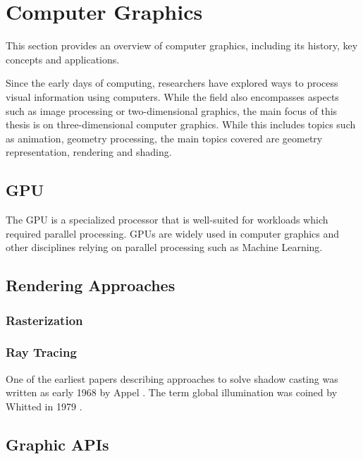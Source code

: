 
\section{Computer Graphics}

This section provides an overview of computer graphics, including its history, key concepts and applications.

Since the early days of computing, researchers have explored ways to process visual information using computers. While the field also encompasses aspects such as image processing or two-dimensional graphics, the main focus of this thesis is on three-dimensional computer graphics. While this includes topics such as animation, geometry processing, the main topics covered are geometry representation, rendering and shading.

\subsection{GPU}

The GPU is a specialized processor that is well-suited for workloads which required parallel processing. GPUs are widely used in computer graphics and other disciplines relying on parallel processing such as Machine Learning.

\subsection{Rendering Approaches}

\subsubsection{Rasterization}
\subsubsection{Ray Tracing}

One of the earliest papers describing approaches to solve shadow casting was written as early 1968 by Appel \cite{appel1968shading}. The term global illumination was coined by Whitted in 1979 \cite{whitted2020OriginsOfGlobalIllumination}.


\subsection{Graphic APIs}
